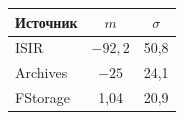\begin{table}\small %


\begin{minipage}[t]{140pt}


\begin{center}




\end{center}


\end{minipage}


\hfill


\begin{minipage}[t]{160pt}


\begin{center}




\end{center}


\end{minipage}


\vspace*{2ex}


\begin{minipage}[t]{140pt}


\begin{center}


\tabcolsep=7.1pt


\begin{tabular}{|l|c|c|}


\hline


\multicolumn{1}{|c|}{Источник}&$m$&$\sigma$\\


\hline


ISIR&\hphantom{,0}$-92{,}2$&50,8\\


Archives&$-25$&24,1\\


FStorage&\hphantom{$-$9}1,04&20,9\\


\hline


\end{tabular}


\end{center}



\end{minipage}
\end{table}
